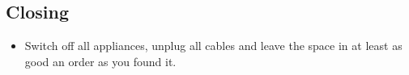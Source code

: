 \documentclass[../Elmag-labhefte-2020.tex]{subfiles}
\begin{document}
\subsection{Closing}

\begin{itemize}
    \item Switch off all appliances, unplug all cables and leave the space in at least as good an order as you found it.
\end{itemize}

\end{document}
